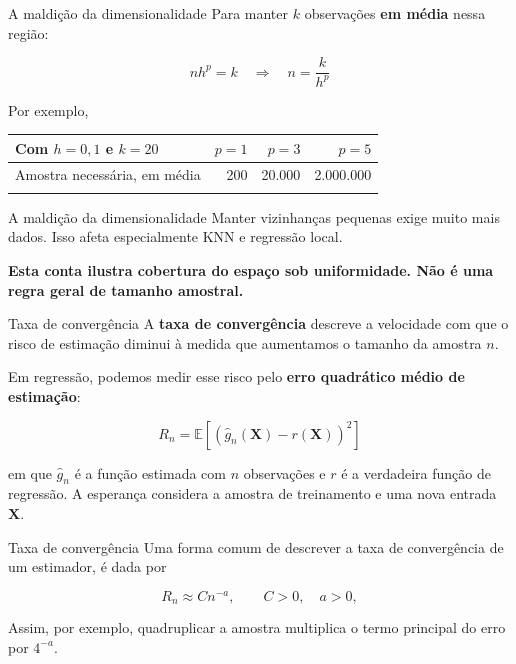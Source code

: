 \documentclass[
  10pt,
  ignorenonframetext,
  aspectratio=169,
  brazilian,
]{beamer}
\newcounter{none} %
\begin{document}
\begin{frame}{A maldição da dimensionalidade}
\protect{}\label{a-maldiuxe7uxe3o-da-dimensionalidade-1}
Para manter \(k\) observações \textbf{em média} nessa região:

\[
\boxed{nh^p=k\quad\Longrightarrow\quad n=\frac{k}{h^p}}
\]

Por exemplo,

{\def\LTcaptype{none} %
\begin{longtable}[]{@{}lrrr@{}}
\toprule\noalign{}
Com \(h=0{,}1\) e \(k=20\) & \(p=1\) & \(p=3\) & \(p=5\) \\
\midrule\noalign{}
\endhead
Amostra necessária, em média & 200 & 20.000 & 2.000.000 \\
\bottomrule\noalign{}
\end{longtable}
}
\end{frame}

\begin{frame}{A maldição da dimensionalidade}
\protect{}\label{a-maldiuxe7uxe3o-da-dimensionalidade-2}
Manter vizinhanças pequenas exige muito mais dados. Isso afeta
especialmente KNN e regressão local.

\textbf{Esta conta ilustra cobertura do espaço sob uniformidade. Não é
uma regra geral de tamanho amostral.}
\end{frame}

\begin{frame}{Taxa de convergência}
\protect{}\label{taxa-de-converguxeancia}
A \textbf{taxa de convergência} descreve a velocidade com que o risco de
estimação diminui à medida que aumentamos o tamanho da amostra \(n\).

Em regressão, podemos medir esse risco pelo \textbf{erro quadrático
médio de estimação}:

\[
R_n =
\mathbb{E}\left[
\left(\hat g_n(\mathbf X)-r(\mathbf X)\right)^2
\right]
\]

em que \(\hat g_n\) é a função estimada com \(n\) observações e \(r\) é
a verdadeira função de regressão. A esperança considera a amostra de
treinamento e uma nova entrada \(\mathbf X\).
\end{frame}

\begin{frame}{Taxa de convergência}
\protect{}\label{taxa-de-converguxeancia-1}
Uma forma comum de descrever a taxa de convergência de um estimador, é
dada por

\[
\boxed{R_n \approx Cn^{-a}, \qquad C>0,\quad a>0,}
\]

Assim, por exemplo, quadruplicar a amostra multiplica o termo principal
do erro por \(4^{-a}\).
\end{frame}
\end{document}
